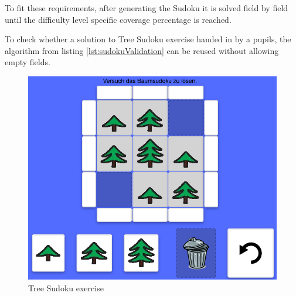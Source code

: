To fit these requirements, after generating the Sudoku it is solved field by field until the difficulty level specific coverage percentage is reached.

To check whether a solution to Tree Sudoku exercise handed in by a pupils, the algorithm from listing \ref{lst:sudokuValidation} can be reused without allowing empty fields.

\begin{figure} 
    \centering
    \includegraphics[width=0.6 \columnwidth]{figures/tree_sudoku_example_exercise.png}
    \caption{Tree Sudoku exercise} 
    \label{fig:tree_sudoku_example_exercise} 
\end{figure}